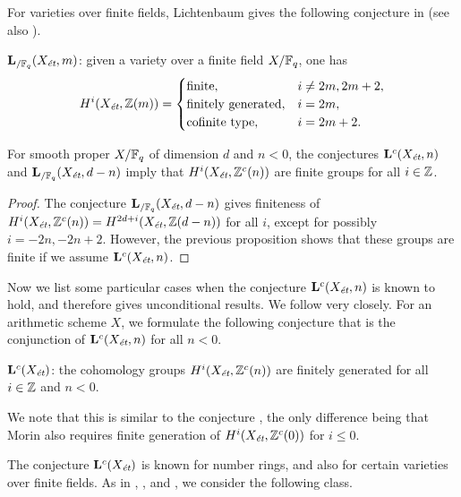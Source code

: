 \documentclass{article}
\numberwithin{equation}{section}
\begin{document}
For varieties over finite fields, Lichtenbaum gives the following conjecture in
\cite[\S 7]{Lichtenbaum-1984} (see also \cite[\S 4]{Geisser-2017}).

\begin{conjecture}
  $\mathbf{L}_{/\FF_q} (X_\et, m)$: given a variety over a finite field
  $X/\FF_q$, one has
  \[ H^i (X_\et, \ZZ (m)) = \begin{cases}
      \text{finite}, & i \ne 2m, 2m+2, \\
      \text{finitely generated}, & i = 2m, \\
      \text{cofinite type}, & i = 2m + 2.
    \end{cases} \]
\end{conjecture}

\begin{proposition}
  \label{prop:Lc-Xet-n-over-finite-fields}
  For smooth proper $X/\FF_q$ of dimension $d$ and $n < 0$, the conjectures
  $\mathbf{L}^c (X_\et, n)$ and $\mathbf{L}_{/\FF_q} (X_\et, d-n)$ imply that
  $H^i (X_\et, \ZZ^c (n))$ are finite groups for all $i \in \ZZ$.

  \begin{proof}
    The conjecture $\mathbf{L}_{/\FF_q} (X_\et, d-n)$ gives finiteness of
    $H^i (X_\et, \ZZ^c (n)) = H^{2d + i} (X_\et, \ZZ (d-n))$ for all $i$, except
    for possibly $i = -2n, -2n + 2$. However, the previous proposition shows
    that these groups are finite if we assume $\mathbf{L}^c (X_\et, n)$.
  \end{proof}
\end{proposition}

Now we list some particular cases when the conjecture $\mathbf{L}^c (X_\et,n)$
is known to hold, and therefore gives unconditional results. We follow
\cite[\S 5]{Morin-2014} very closely. For an arithmetic scheme $X$, we formulate
the following conjecture that is the conjunction of $\mathbf{L}^c (X_\et,n)$ for
all $n < 0$.

\begin{conjecture}
  $\mathbf{L}^c (X_\et)$: the cohomology groups $H^i (X_\et, \ZZ^c (n))$ are
  finitely generated for all $i \in \ZZ$ and $n < 0$.
\end{conjecture}

We note that this is similar to the conjecture
\cite[Definition~5.8]{Morin-2014}, the only difference being that Morin also
requires finite generation of $H^i (X_\et, \ZZ^c (0))$ for $i \le 0$.

The conjecture $\mathbf{L}^c (X_\et)$ is known for number rings, and also for
certain varieties over finite fields. As in \cite{Soule-1984},
\cite{Geisser-2004}, and \cite{Morin-2014}, we consider the following class.
\end{document}
